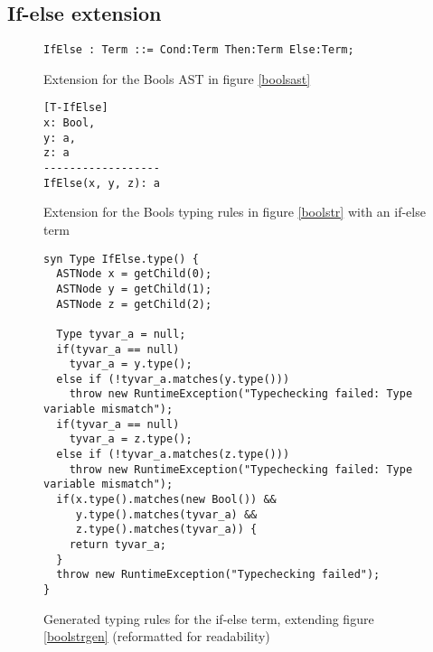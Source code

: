 \documentclass[nofilelist]{cslthse-msc}
\begin{document}
\subsection{If-else extension}

\begin{figure}[h]
\begin{lstlisting}[]
IfElse : Term ::= Cond:Term Then:Term Else:Term;
\end{lstlisting}
  \caption{Extension for the Bools AST in figure \ref{boolsast}}
  \label{ifelseast}
\end{figure}

\begin{figure}[h]
\begin{lstlisting}[]
[T-IfElse]
x: Bool,
y: a,
z: a
------------------
IfElse(x, y, z): a
\end{lstlisting}
  \caption{Extension for the Bools typing rules in figure \ref{boolstr} with an if-else term}
  \label{ifelsetr}
\end{figure}
\begin{figure}[h]
\begin{lstlisting}[language=jrag]
syn Type IfElse.type() {
  ASTNode x = getChild(0);
  ASTNode y = getChild(1);
  ASTNode z = getChild(2);

  Type tyvar_a = null;
  if(tyvar_a == null)
    tyvar_a = y.type();
  else if (!tyvar_a.matches(y.type()))
    throw new RuntimeException("Typechecking failed: Type variable mismatch");
  if(tyvar_a == null)
    tyvar_a = z.type();
  else if (!tyvar_a.matches(z.type()))
    throw new RuntimeException("Typechecking failed: Type variable mismatch");
  if(x.type().matches(new Bool()) &&
     y.type().matches(tyvar_a) &&
     z.type().matches(tyvar_a)) {
    return tyvar_a;
  }
  throw new RuntimeException("Typechecking failed");
}
\end{lstlisting}
  \caption{Generated typing rules for the if-else term, extending figure \ref{boolstrgen} (reformatted for readability)}
  \label{ifelsetrgen}
\end{figure}
\end{document}
